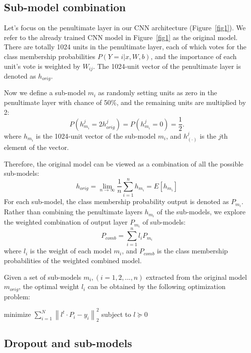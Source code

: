 \documentclass{article} %
\begin{document}
\subsection{Sub-model combination}
Let's focus on the penultimate layer in our CNN architecture (Figure~\ref{fig1}). We refer to the already trained CNN model in Figure~\ref{fig1} as the original model. There are totally 1024 units in the penultimate layer, each of which votes for the class membership probabilities $P(Y=i|x,W,b)$, and the importance of each unit's vote is weighted by $W_{ij}$.  The 1024-unit vector of the penultimate layer is denoted as $h_{orig}$.
\par
Now we define a sub-model $m_{i}$ as randomly setting units as zero in the penultimate layer with chance of 50\%, and the remaining units are multiplied by 2:
\begin{equation}
P(h_{m_{i}}^{j}=2h_{orig}^{j})=P(h_{m_{i}}^{j}=0)=\frac{1}{2}.
\end{equation}
where  $h_{m_{i}}$ is the 1024-unit vector of the sub-model $m_{i}$, and $h_{(\cdot)}^{j}$ is the $j$th element of the vector. 
\par
Therefore, the original model can be viewed as a combination of all the possible sub-models:
\begin{equation}
h_{orig} = \lim_{n \to \infty }\frac{1}{n}\sum_{i=1}^{n}h_{m_{i}}=E\left [ h_{m_{i}} \right ]
\end{equation}
For each sub-model, the class membership probability output is denoted as $P_{m_{i}}$. Rather than combining the penultimate layers $h_{m_{i}}$ of the sub-models, we explore the weighted combination of output layer $P_{m_{i}}$ of sub-models:
\begin{equation}
P_{comb} = \sum_{i=1}^{n}l_{i}P_{m_{i}}
\end{equation}
where $l_{i}$ is the weight of each model $m_{i}$, and $P_{comb}$ is the class membership probabilities of the weighted combined model.
\par
Given a set of sub-models $m_{i}, (i = 1,2, ... ,n)$ extracted from the original model $m_{orig}$, the optimal weight $l_{i}$  can be obtained by the following optimization problem:
\par
\setlength{\parindent}{3em}
minimize $\sum_{i=1}^{N}\left \| l^{t}\cdot P_{i}-y_{i} \right \|_{2}^{2}$
\setlength{\parindent}{3em}
subject to $l\succeq 0$

\subsection{Dropout and sub-models}
\end{document}
